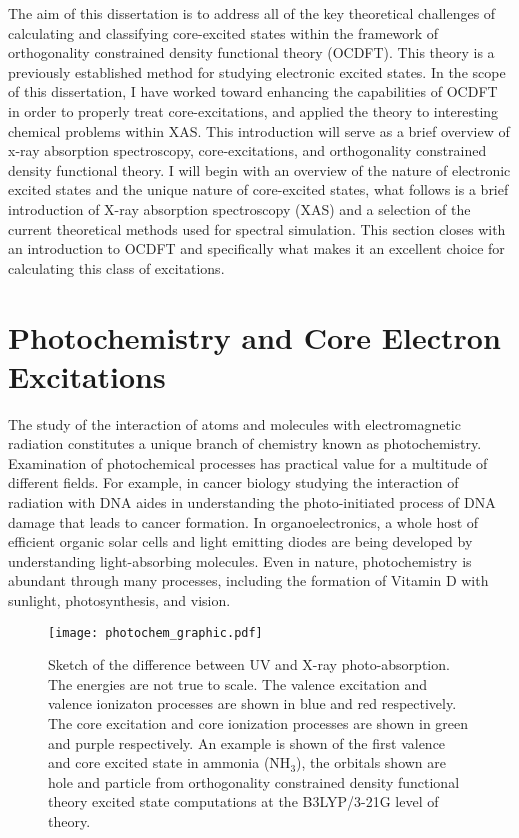 \documentclass{article}
\begin{document}
The aim of this dissertation is to address all of the key theoretical challenges of calculating and classifying core-excited states within the framework of orthogonality constrained density functional theory (OCDFT). This theory is a previously established \cite{evangelista_orthogonality_2013} method for studying electronic excited states. In the scope of this dissertation, I have worked toward enhancing the capabilities of OCDFT in order to properly treat core-excitations, and applied the theory to interesting chemical problems within XAS. This introduction will serve as a brief overview of x-ray absorption spectroscopy, core-excitations, and orthogonality constrained density functional theory. I will begin with an overview of the nature of electronic excited states and the unique nature of core-excited states, what follows is a brief introduction of X-ray absorption spectroscopy (XAS) and a selection of the current theoretical methods used for spectral simulation. This section closes with an introduction to OCDFT and specifically what makes it an excellent choice for calculating this class of excitations. 
 
\section{Photochemistry and Core Electron Excitations}
The study of the interaction of atoms and molecules with electromagnetic radiation constitutes a unique branch of chemistry known as photochemistry. Examination of photochemical processes has practical value for a multitude of different fields. For example, in cancer biology studying the interaction of radiation with DNA aides in understanding the photo-initiated process of DNA damage that leads to cancer formation. \cite{} In organoelectronics, a whole host of efficient organic solar cells and light emitting diodes are being developed by understanding light-absorbing molecules. Even in nature, photochemistry is abundant through many processes, including the  formation of Vitamin D with sunlight,\cite{holick_vitamin_2003} photosynthesis,\cite{krause_chlorophyll_1991} and vision. \cite{de_vries_quantum_1943}
\begin{figure}[h!]
\centering
\texttt{[image: photochem\_graphic.pdf]}
\caption{Sketch of the difference between UV and X-ray photo-absorption. The energies are not true to scale. The valence excitation and valence ionizaton processes are shown in blue and red respectively. The core excitation and core ionization processes are shown in green and purple respectively. An example is shown of the first valence and core excited state in ammonia (NH$_3$), the orbitals shown are hole and particle from orthogonality constrained density functional theory excited state computations at the B3LYP/3-21G level of theory.}
\label{fig:photochem}
\end{figure}
\end{document}
